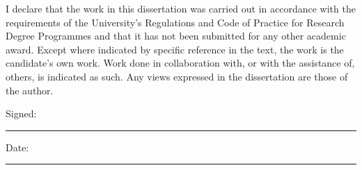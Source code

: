 \documentclass[
11pt, %
english, %
onehalfspacing, %
headsepline, %
]{MastersDoctoralThesis} %
\begin{document}


\begin{declaration}
\addchaptertocentry{\authorshipname} %
%

I declare that the work in this dissertation was carried out in accordance with the requirements of the University's Regulations and Code of Practice for Research Degree Programmes and that it has not been submitted for any other academic award. Except where indicated by specific reference in the text, the work is the candidate's own work. Work done in collaboration with, or with the assistance of, others, is indicated as such. Any views expressed in the dissertation are those of the author.

\noindent Signed:\\
\rule[0.5em]{25em}{0.5pt} %

\noindent Date:\\
\rule[0.5em]{25em}{0.5pt} %
\end{declaration}
\end{document}
